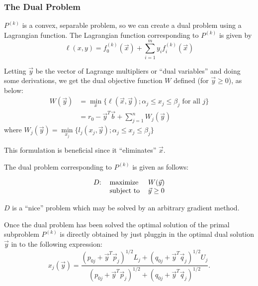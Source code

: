 \subsubsection*{The Dual Problem}

$P^{(k)}$ is a convex, separable problem, so we can create a dual problem using a Lagrangian function. The Lagrangian function corresponding to $P^{(k)}$ is given by 
{\color{baystate}
	$$\ell(x,y)=f_0^{(k)}(\vec{x})+\sum\limits_{i=1}^{m}y_if_i^{(k)}(\vec{x})$$
}

Letting $\vec{y}$ be the vector of {\color{tiananmen}Lagrange multipliers} or ``dual variables'' and doing some derivations, we get the {\color{tiananmen}dual objective function} $W$ defined (for $\vec{y}\geq 0$), as below:
{\color{baystate}
	\begin{align*}
		W(\vec{y})&=\min\limits_x\lbrace\ell(\vec{x},\vec{y}); \alpha_j\leq x_j\leq \beta_j\text{ for all }j\rbrace\\
		&=r_0-\vec{y}^T\vec{b}+\sum\limits_{j=1}^{n}W_j(\vec{y})
	\end{align*}
	where $W_j(\vec{y})=\min\limits_{x_j}\lbrace l_j(x_j,\vec{y}); \alpha_j\leq x_j\leq \beta_j\rbrace$
}

This formulation is beneficial since it ``eliminates'' $\vec{x}$.

The dual problem corresponding to $P^{(k)}$ is given as follows:

{\color{baystate}
	\begin{equation}
		\begin{tabular}{lll}
			$D$: & maximize & $W(\vec{y})$\\
			& subject to & $\vec{y}\geq 0$
		\end{tabular}
	\end{equation}
}

$D$ is a ``nice'' problem which may be solved by an arbitrary gradient method.

Once the dual problem has been solved the optimal solution of the primal subproblem $P^{(k)}$ is directly obtained by just pluggin in the optimal dual solution $\vec{y}$ in to the following expression:
{\color{baystate}
	$$x_j(\vec{y})=\frac{\left(p_{0j}+\vec{y}^T\vec{p}_j\right)^{1/2}L_j+\left(q_{0j}+\vec{y}^T\vec{q}_j\right)^{1/2}U_j}{\left(p_{0j}+\vec{y}^T\vec{p}_j\right)^{1/2}+\left(q_{0j}+\vec{y}^T\vec{q}_j\right)^{1/2}}.$$
}